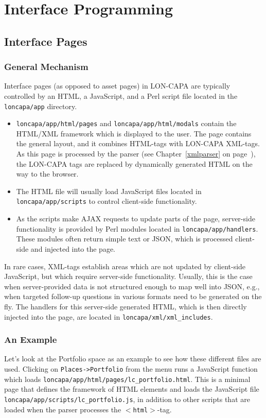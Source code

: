 \chapter{Interface Programming}
\label{interfaceprogramming}
\section{Interface Pages}
\subsection{General Mechanism}
Interface pages (as opposed to asset pages) in LON-CAPA are typically controlled by an HTML, a JavaScript, and a Perl script file located in the {\tt loncapa/app} directory.
\begin{itemize}
\item  {\tt loncapa/app/html/pages} and {\tt loncapa/app/html/modals} contain the HTML/XML framework which is displayed to the user. The page contains the general layout, and it combines HTML-tags with LON-CAPA XML-tags. As this
page is processed by the parser (see Chapter~\ref{xmlparser} on page~\pageref{xmlparser}), the LON-CAPA tags are replaced by dynamically generated HTML on the way to the browser.
\item The HTML file will usually load JavaScript files located in {\tt loncapa/app/scripts} to control client-side functionality.
\item As the scripts make AJAX requests to update parts of the page, server-side functionality is provided by Perl modules located in {\tt loncapa/app/handlers}. These modules often return simple text or JSON, which is processed client-side and injected into the page.
\end{itemize}
In rare cases, XML-tags establish areas which are not updated by client-side JavaScript, but which require server-side functionality. Usually, this is the case when server-provided data is not
structured enough to map well into JSON, e.g., when targeted follow-up questions in various formats need to be generated on the fly. The handlers for this server-side generated HTML, which is then
directly injected into the page, are located in {\tt loncapa/xml/xml\_includes}.
\subsection{An Example}
Let's look at the Portfolio space as an example to see how these different files are used.  Clicking on {\tt Places->Portfolio} from the menu runs a JavaScript function which loads {\tt loncapa/app/html/pages/lc\_portfolio.html}.  This is a minimal page that defines the framework of HTML elements and loads the JavaScript file {\tt loncapa/app/scripts/lc\_portfolio.js}, in addition to other scripts that are loaded when the parser processes the {\tt $<$html$>$}-tag.
